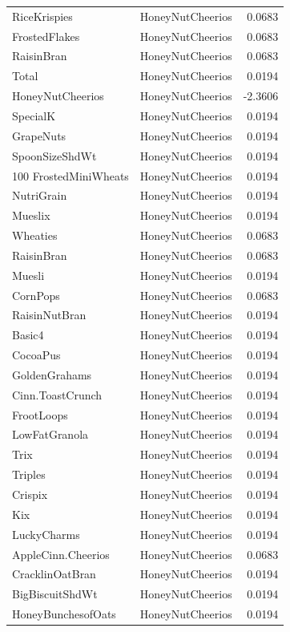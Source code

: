 \begin{longtable}{llr}
RiceKrispies & HoneyNutCheerios & 0.0683 \\
FrostedFlakes & HoneyNutCheerios & 0.0683 \\
RaisinBran & HoneyNutCheerios & 0.0683 \\
Total & HoneyNutCheerios & 0.0194 \\
HoneyNutCheerios & HoneyNutCheerios & -2.3606 \\
SpecialK & HoneyNutCheerios & 0.0194 \\
GrapeNuts & HoneyNutCheerios & 0.0194 \\
SpoonSizeShdWt & HoneyNutCheerios & 0.0194 \\
100%
FrostedMiniWheats & HoneyNutCheerios & 0.0194 \\
NutriGrain & HoneyNutCheerios & 0.0194 \\
Mueslix & HoneyNutCheerios & 0.0194 \\
Wheaties & HoneyNutCheerios & 0.0683 \\
RaisinBran & HoneyNutCheerios & 0.0683 \\
Muesli & HoneyNutCheerios & 0.0194 \\
CornPops & HoneyNutCheerios & 0.0683 \\
RaisinNutBran & HoneyNutCheerios & 0.0194 \\
Basic4 & HoneyNutCheerios & 0.0194 \\
CocoaPus & HoneyNutCheerios & 0.0194 \\
GoldenGrahams & HoneyNutCheerios & 0.0194 \\
Cinn.ToastCrunch & HoneyNutCheerios & 0.0194 \\
FrootLoops & HoneyNutCheerios & 0.0194 \\
LowFatGranola & HoneyNutCheerios & 0.0194 \\
Trix & HoneyNutCheerios & 0.0194 \\
Triples & HoneyNutCheerios & 0.0194 \\
Crispix & HoneyNutCheerios & 0.0194 \\
Kix & HoneyNutCheerios & 0.0194 \\
LuckyCharms & HoneyNutCheerios & 0.0194 \\
AppleCinn.Cheerios & HoneyNutCheerios & 0.0683 \\
CracklinOatBran & HoneyNutCheerios & 0.0194 \\
BigBiscuitShdWt & HoneyNutCheerios & 0.0194 \\
HoneyBunchesofOats & HoneyNutCheerios & 0.0194 \\

\end{longtable}
